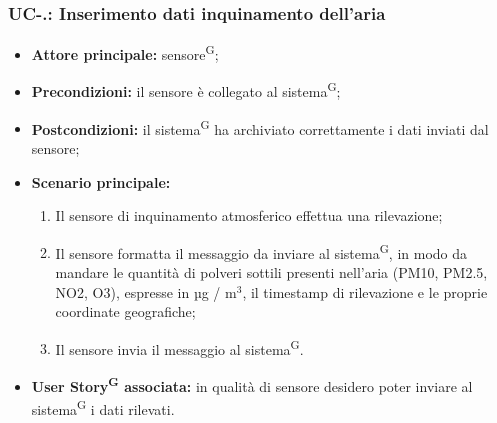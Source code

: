\documentclass[8pt]{article}
\newcommand{\glossterm}[1]{#1\textsuperscript{G}} %
\begin{document}
\subsubsection*{UC-\theuc .\speconenumber: Inserimento dati inquinamento dell'aria}
\begin{itemize}
    \item \textbf{Attore principale:} \glossterm{sensore};
    \item \textbf{Precondizioni:} il sensore è collegato al \glossterm{sistema};
    \item \textbf{Postcondizioni:} il \glossterm{sistema} ha archiviato correttamente i dati inviati dal sensore;
    \item \textbf{Scenario principale:}
        \begin{enumerate}
        \item Il sensore di inquinamento atmosferico effettua una rilevazione;
        \item Il sensore formatta il messaggio da inviare al \glossterm{sistema}, in modo da mandare le quantità di polveri sottili presenti nell'aria (PM10, PM2.5, NO2, O3), espresse in µg / $\mbox{m}^{\mbox{3}}$, il timestamp di rilevazione e le proprie
coordinate geografiche;
        \item Il sensore invia il messaggio al \glossterm{sistema}.
        \end{enumerate}
    \item \textbf{\glossterm{User Story} associata:} in qualità di sensore desidero poter inviare al \glossterm{sistema} i
        dati rilevati.
\end{itemize}
\end{document}
